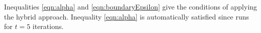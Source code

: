 Inequalities \ref{eqn:alpha} and \ref{eqn:boundaryEpsilon} give the conditions of applying the hybrid approach. Inequality \ref{eqn:alpha} is automatically satisfied since \dpl runs for $t=5$ iterations.



\begin{comment}
\subsection{Improved Hybrid Approach}

\begin{align*}
\mathrm{Error}_{\mathrm{hybrid}} &= G(f)\\
                                 &= \frac{1}{3}\cdot\mathrm{Error}_{\mathrm{EUGkM}} + \mathrm{Error}_{\mathrm{DPLloyd}, t = 1} \\
                                 &= \frac{1}{3}\cdot \frac{2dr^2(k)^{\frac{d-2}{d}}}{3\times (10)^{\frac{2d}{2+d}}(Nf\epsilon)^{\frac{4}{2+d}}} \\
                                 &+ 2d (1+(2\rho r)^2) \left(\frac{k(dr+1)}{N (1-f) \epsilon}\right)^2
\end{align*}

Let 
\begin{align*}
\alpha = \frac{2dr^2(k)^{\frac{d-2}{d}}}{3\times (10)^{\frac{2d}{2+d}}\left(N\epsilon\right)^{\frac{4}{2+d}}}
\end{align*} 
and 
\begin{align*}
\beta = 2d(1+(2\rho r)^2) \left(\frac{k(dr+1)}{N\epsilon}\right)^2,
\end{align*}
\begin{align*}
G(f) &= \frac{\alpha}{3}\cdot\left(\frac{1}{f}\right)^{\frac{4}{2+d}} + \beta\cdot \left(\frac{1}{1-f}\right)^2
\end{align*}

Optimze $G(f)$ over $f$ by taking the first derivative of $\mathrm{Error}_{\mathrm{hybrid}}$,
\begin{align*}
\diff{G(f)}{f} &= -\frac{4\alpha}{3(2+d)} \cdot f^{-\frac{6+d}{2+d}} + 2\beta (1 - f)^{-3}
\end{align*}

Setting $\diff{G(f)}{f} = 0$, we have 
\begin{align*}
\frac{3\beta(2+d)}{2\alpha}\cdot f^{\frac{6+d}{2+d}} - (1 - f)^{3} = 0.
\end{align*}

\begin{align*}
\diff[2]{G(f)}{f} &= \frac{4\alpha(6+d)}{3(2+d)^2} \cdot f^{-\frac{8+2d}{2+d}} + 6\beta (1 - f)^{-4}\\
                                                &> 0.
\end{align*}
Therefore, $G(f)$ has a global minimum. 


\end{comment}
